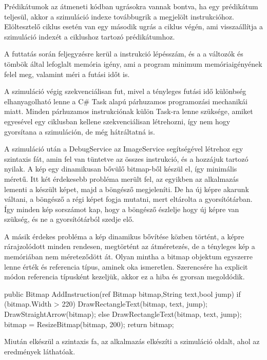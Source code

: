 Prédikátumok az átmeneti kódban ugrásokra vannak bontva, ha egy prédikátum teljesül, akkor a szimuláció indexe továbbugrik a megjelölt instrukcióhoz. Elöltesztelő ciklus esetén van egy második ugrás a ciklus végén, ami visszaállítja a szimuláció indexét a ciklushoz tartozó prédikátumhoz.

A futtatás során feljegyzésre kerül a instrukció lépésszám, és a a változók és tömbök által lefoglalt memória igény, ami a program minimum memóriaigényének felel meg, valamint méri a futási időt is. 

A szimuláció végig szekvenciálisan fut, mivel a tényleges futási idő különbség elhanyagolható lenne a C\# Task alapú párhuzamos programozási mechanikái miatt. Minden párhuzamos instrukciónak külön Task-ra lenne szüksége, amiket egyesével egy ciklusban kellene szekvenciálisan létrehozni, így nem hogy gyorsítana a szimuláción, de még hátráltatná is.

A szimuláció után a DebugService az ImageService segítségével létrehoz egy szintaxis fát, amin fel van tüntetve az összes instrukció, és a hozzájuk tartozó nyilak. A kép egy dinamikusan bővülő bitmap-ből készül el, így minimális méretű. Itt két érdekesebb probléma merült fel, az egyikben az alkalmazás lementi a készült képet, majd a böngésző megjeleníti. De ha új képre akarunk váltani, a böngésző a régi képet fogja mutatni, mert eltárolta a gyorsítótárban. Így minden kép sorszámot kap, hogy a böngésző észlelje hogy új képre van szükség, és ne a gyorsítótárból szedje elő. 

A másik érdekes probléma a kép dinamikus bővítése közben történt, a képre rárajzolódott minden rendesen, megtörtént az átméretezés, de a tényleges kép a memóriában nem méreteződött át. Olyan mintha a bitmap objektum egyszerre lenne érték és referencia típus, aminek oka ismeretlen. Szerencsére ha explicit módon referencia típusként kezeljük, akkor ez a hiba és gyorsan megoldódik.

\begin{cpp}
public Bitmap AddInstruction(ref Bitmap bitmap,String text,bool jump)
{
      if (bitmap.Width > 220)
      {
           DrawRectangleText(bitmap, text, jump);
           DrawStraightArrow(bitmap);
       }
       else
       {
           DrawRectangleText(bitmap, text, jump);
       }
       bitmap = ResizeBitmap(bitmap, 200);
       return bitmap;
}
\end{cpp}

Miután elkészül a szintaxis fa, az alkalmazás elkészíti a szimuláció oldalt, ahol az eredmények láthatóak.

